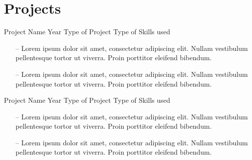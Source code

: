 \documentclass{cvlayout}
\begin{document}
\vspace{25pt}
\begin{minipage}[t]{0.95\textwidth}

\section{Projects}

\workentry
{Project Name}
{Year}
{Type of Project}
{Type of Skills used}

\vspace{-15pt}
\begin{itemize}
    \setlength\itemsep{0em}
    \item[--] Lorem ipsum dolor sit amet, consectetur adipiscing elit. Nullam vestibulum pellentesque tortor ut viverra. Proin porttitor eleifend bibendum.
    \item[--] Lorem ipsum dolor sit amet, consectetur adipiscing elit. Nullam vestibulum pellentesque tortor ut viverra. Proin porttitor eleifend bibendum.

\end{itemize}
\vspace{6pt}


\workentry
{Project Name}
{Year}
{Type of Project}
{Type of Skills used}

\vspace{-15pt}
\begin{itemize}
    \setlength\itemsep{0em}
    \item[--] Lorem ipsum dolor sit amet, consectetur adipiscing elit. Nullam vestibulum pellentesque tortor ut viverra. Proin porttitor eleifend bibendum.
    \item[--] Lorem ipsum dolor sit amet, consectetur adipiscing elit. Nullam vestibulum pellentesque tortor ut viverra. Proin porttitor eleifend bibendum.
\end{itemize}


\end{minipage}
\end{document}
